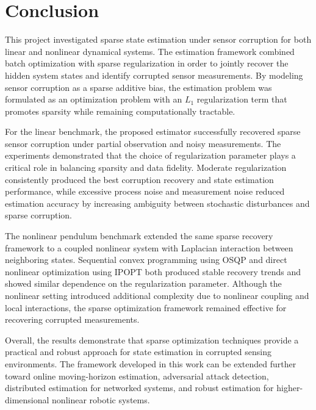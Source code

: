 \documentclass[conference]{IEEEtran}
\begin{document}
\section{Conclusion}

This project investigated sparse state estimation under sensor corruption for both linear and nonlinear dynamical systems. The estimation framework combined batch optimization with sparse regularization in order to jointly recover the hidden system states and identify corrupted sensor measurements. By modeling sensor corruption as a sparse additive bias, the estimation problem was formulated as an optimization problem with an $L_1$ regularization term that promotes sparsity while remaining computationally tractable.

For the linear benchmark, the proposed estimator successfully recovered sparse sensor corruption under partial observation and noisy measurements. The experiments demonstrated that the choice of regularization parameter plays a critical role in balancing sparsity and data fidelity. Moderate regularization consistently produced the best corruption recovery and state estimation performance, while excessive process noise and measurement noise reduced estimation accuracy by increasing ambiguity between stochastic disturbances and sparse corruption.

The nonlinear pendulum benchmark extended the same sparse recovery framework to a coupled nonlinear system with Laplacian interaction between neighboring states. Sequential convex programming using OSQP and direct nonlinear optimization using IPOPT both produced stable recovery trends and showed similar dependence on the regularization parameter. Although the nonlinear setting introduced additional complexity due to nonlinear coupling and local interactions, the sparse optimization framework remained effective for recovering corrupted measurements.

Overall, the results demonstrate that sparse optimization techniques provide a practical and robust approach for state estimation in corrupted sensing environments. The framework developed in this work can be extended further toward online moving-horizon estimation, adversarial attack detection, distributed estimation for networked systems, and robust estimation for higher-dimensional nonlinear robotic systems.


\end{document}
